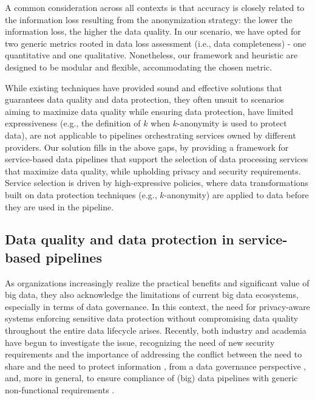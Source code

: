 {%
A common consideration across all contexts is that accuracy is closely related to the information loss resulting from the anonymization strategy: the lower the information loss, the higher the data quality. In our scenario, we have opted for two generic metrics rooted in data loss assessment (i.e., data completeness) - one quantitative and one qualitative. Nonetheless, our framework and heuristic are designed to be modular and flexible, accommodating the chosen metric.

    {\color{OurColor} While existing techniques have provided sound and effective solutions that guarantees data quality and data protection, they often unsuit to scenarios aiming to maximize data quality while ensuring data protection, have limited expressiveness (e.g., the definition of $k$ when $k$-anonymity is used to protect data), are not applicable to pipelines orchestrating services owned by different providers. Our solution fills in the above gaps, by providing a framework for service-based data pipelines that support the selection of data processing services that maximize data quality, while upholding privacy and security requirements. Service selection is driven by high-expressive policies, where data transformations built on data protection techniques (e.g., $k$-anonymity) are applied to data before they are used in the pipeline.}

\subsection{Data quality and data protection in service-based pipelines}\label{sec:datagov}

As organizations increasingly realize the practical benefits and significant value of big data, they also acknowledge the limitations of current big data ecosystems, especially in terms of data governance. In this context, the need for privacy-aware systems enforcing sensitive data protection without compromising data quality throughout the entire data lifecycle arises. Recently, both industry and academia have begun to investigate the issue, recognizing the need of new security requirements \cite{Colombo:JournCybersec:2019} and the importance of addressing the conflict between the need to share and the need to protect information \cite{balancingact,VANDENBROEK2018330,balancingInMedicine,needtobalance,dataProtection}, from a data governance perspective \cite{al2018exploring,aissa2020decide}, and, more in general, to ensure compliance of (big) data pipelines with generic non-functional requirements \cite{ABBJ.ICWS2022,ABHKKS.BD2023}.

}
